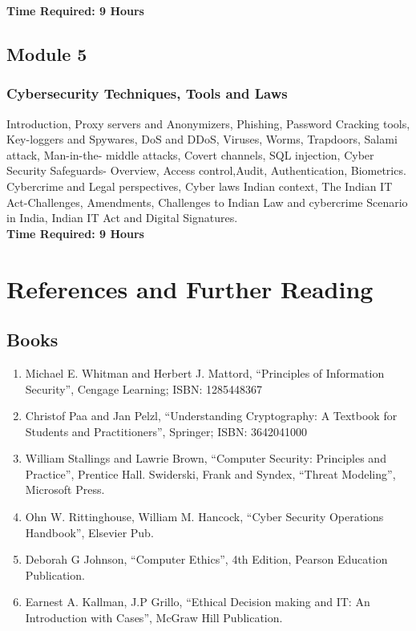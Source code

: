 \documentclass[openany]{book}
\begin{document}
\noindent
\textbf{Time Required: 9 Hours}


\section{Module 5}

\subsection{Cybersecurity Techniques, Tools and Laws}
Introduction, Proxy servers and Anonymizers, Phishing, Password Cracking tools, Key-loggers
and Spywares, DoS and DDoS, Viruses, Worms, Trapdoors, Salami attack, Man-in-the- middle
attacks, Covert channels, SQL injection, Cyber Security Safeguards- Overview, Access control,Audit, Authentication, Biometrics. Cybercrime and Legal perspectives, Cyber laws Indian context,
The Indian IT Act-Challenges, Amendments, Challenges to Indian Law and cybercrime Scenario in
India, Indian IT Act and Digital Signatures.\\


\noindent
\textbf{Time Required: 9 Hours}

\chapter{References and Further Reading}
\section{Books}
\begin{enumerate}
	\item Michael E. Whitman and Herbert J. Mattord, “Principles of Information Security”, Cengage Learning;
	      ISBN: 1285448367
	\item Christof Paa and Jan Pelzl, “Understanding Cryptography: A Textbook for Students and Practitioners”,
	      Springer; ISBN: 3642041000
	\item William Stallings and Lawrie Brown, “Computer Security: Principles and Practice”, Prentice Hall.
	      Swiderski, Frank and Syndex, “Threat Modeling”, Microsoft Press.
	\item Ohn W. Rittinghouse, William M. Hancock, “Cyber Security Operations Handbook”, Elsevier Pub.
	\item Deborah G Johnson, “Computer Ethics”, 4th Edition, Pearson Education Publication.
	\item Earnest A. Kallman, J.P Grillo, “Ethical Decision making and IT: An Introduction with Cases”,
	      McGraw Hill Publication.
\end{enumerate}
\end{document}
